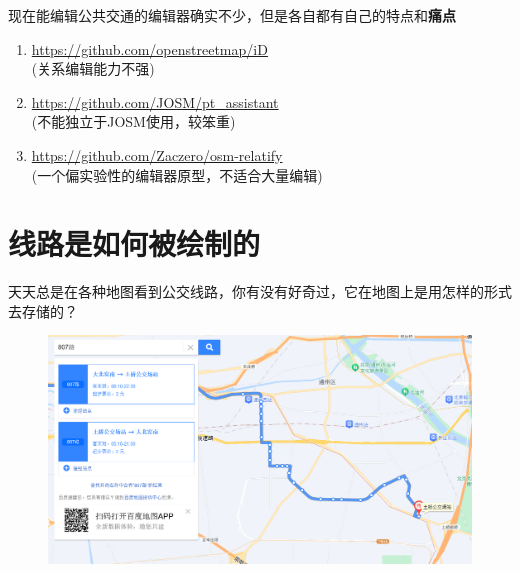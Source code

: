 \documentclass{beamer}
\begin{document}
\begin{frame}
	
	\quad \quad 现在能编辑公共交通的编辑器确实不少，但是各自都有自己的特点和\textbf{痛点}
	
	\begin{enumerate}
		\item \url{https://github.com/openstreetmap/iD} \\
		      (关系编辑能力不强)
		\item \url{https://github.com/JOSM/pt_assistant} \\
		      (不能独立于JOSM使用，较笨重)
		\item \url{https://github.com/Zaczero/osm-relatify} \\
		      (一个偏实验性的编辑器原型，不适合大量编辑)
	\end{enumerate}
\end{frame}

\section{线路是如何被绘制的}

\begin{frame}
	\Large
	\quad \quad 天天总是在各种地图看到公交线路，你有没有好奇过，它在地图上是用怎样的形式去存储的？
\end{frame}

\begin{frame}
	\begin{figure}[htpb]
		\centering
		\includegraphics[width=1.05\linewidth]{figure/map_example-baidu-webbus.png}
	\end{figure}
\end{frame}
\end{document}
